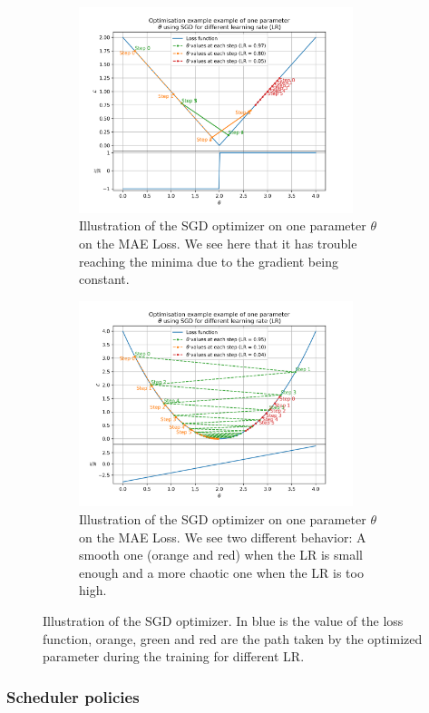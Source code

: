 \documentclass[../main.tex]{subfiles}
\begin{document}
\begin{figure}
  \centering
  \begin{subfigure}[t]{0.48\linewidth}
    \includegraphics[height=6cm]{scripts/plots/MAE_illustration.png}
    \caption{Illustration of the SGD optimizer on one parameter $\theta$ on the MAE Loss. We see here that it has trouble reaching the minima due to the gradient being constant.}
    \label{fig:ml:optims:mae}
  \end{subfigure}
  \hfill
  \begin{subfigure}[t]{0.48\linewidth}
    \includegraphics[height=6cm]{scripts/plots/MSE_illustration.png}
    \caption{Illustration of the SGD optimizer on one parameter $\theta$ on the MAE Loss. We see two different behavior: A smooth one (orange and red) when the LR is small enough and a more chaotic one when the LR is too high.}
  \end{subfigure}
  \caption{Illustration of the SGD optimizer. In blue is the value of the loss function, orange, green and red are the path taken by the optimized parameter during the training for different LR.}
  \label{fig:ml:optims}
\end{figure}

\subsubsection{Scheduler policies}
\end{document}
